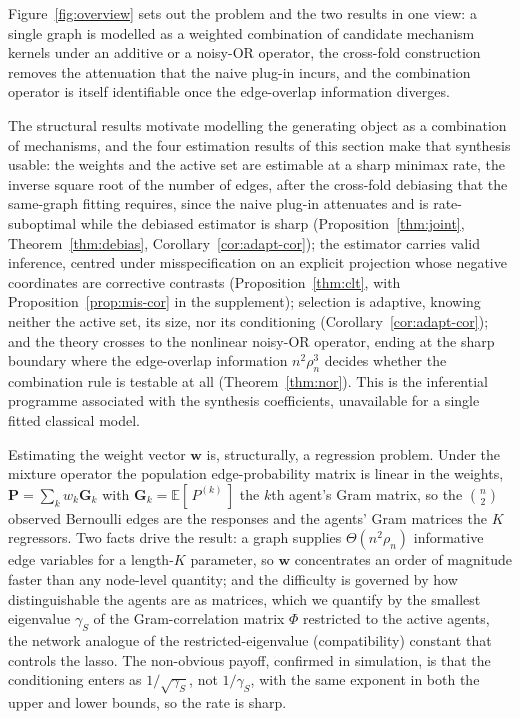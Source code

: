 \documentclass[12pt]{article}
\newcommand{\E}{\mathbb{E}}
\newcommand{\1}{\mathbf{1}}
\newcommand{\Pmat}{\mathbf{P}}
\newcommand{\bw}{\mathbf{w}}
\begin{document}
Figure~\ref{fig:overview} sets out the problem and the two results in one view: a single graph is modelled as a weighted combination of candidate mechanism kernels under an additive or a noisy-OR operator, the cross-fold construction removes the attenuation that the naive plug-in incurs, and the combination operator is itself identifiable once the edge-overlap information diverges.

\label{sec:joint}

The structural results motivate modelling the generating object as a combination of mechanisms, and the four
estimation results of this section make that synthesis usable: the weights and the active set are estimable at
a sharp minimax rate, the inverse square root of the number of edges, after the cross-fold debiasing that the
same-graph fitting requires, since the naive plug-in attenuates and is rate-suboptimal while the debiased
estimator is sharp (Proposition~\ref{thm:joint}, Theorem~\ref{thm:debias}, Corollary~\ref{cor:adapt-cor}); the
estimator carries valid inference, centred under misspecification on an explicit projection whose negative
coordinates are corrective contrasts (Proposition~\ref{thm:clt}, with Proposition~\ref{prop:mis-cor} in the
supplement); selection is adaptive, knowing neither the active set, its size, nor its conditioning
(Corollary~\ref{cor:adapt-cor}); and the theory crosses to the nonlinear noisy-OR operator, ending at the
sharp boundary where the edge-overlap information $n^2\rho_n^3$ decides whether the combination rule is
testable at all (Theorem~\ref{thm:nor}). This is the inferential programme associated with the synthesis
coefficients, unavailable for a single fitted classical model.

Estimating the weight vector $\bw$ is, structurally, a regression problem. Under the mixture operator the
population edge-probability matrix is linear in the weights, $\Pmat=\sum_k w_k \mathbf{G}_k$ with
$\mathbf{G}_k=\E[\,P^{(k)}\,]$ the $k$th agent's Gram matrix, so the $\binom n2$ observed Bernoulli edges are
the responses and the agents' Gram matrices the $K$ regressors. Two facts drive the result: a graph supplies
$\Theta(n^2\rho_n)$ informative edge variables for a length-$K$ parameter, so $\bw$ concentrates an order of
magnitude faster than any node-level quantity; and the difficulty is governed by how distinguishable the
agents are as matrices, which we quantify by the smallest eigenvalue $\gamma_S$ of the Gram-correlation matrix
$\Phi$ restricted to the active agents, the network analogue of the restricted-eigenvalue (compatibility)
constant that controls the lasso. The non-obvious payoff, confirmed in simulation,
is that the conditioning enters as $1/\sqrt{\gamma_S}$, not $1/\gamma_S$, with the same
exponent in
both the upper and lower bounds, so the rate is sharp.
\end{document}
